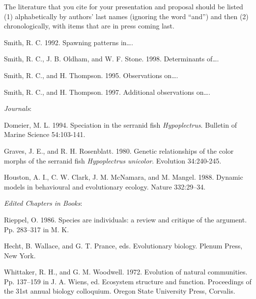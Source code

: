 \documentclass[10pt]{article}
\newcommand{\VSpace}{\vspace{\baselineskip}}
\begin{document}
The literature that you cite for your presentation and proposal should be listed (1) alphabetically by authors’ last names (ignoring the word “and”) and then (2) chronologically, with items that are in press coming last.\VSpace

\noindent Smith, R. C. 1992. Spawning patterns in\dots.

\noindent Smith, R. C., J. B. Oldham, and W. F. Stone. 1998. Determinants of\dots.

\noindent Smith, R. C., and H. Thompson. 1995. Observations on\dots.

\noindent Smith, R. C., and H. Thompson. 1997. Additional observations on\dots.\VSpace

\emph{Journals}:\vspace{0.5\baselineskip}

\begin{hangparas}{1.5em}{1}
Domeier, M. L. 1994. Speciation in the serranid fish \textit{Hypoplectrus}. Bulletin of Marine Science 54:103-141.

Graves, J. E., and R. H. Rosenblatt. 1980. Genetic relationships of the color morphs of the serranid fish \textit{Hypoplectrus unicolor}. Evolution 34:240-245.

Houston, A. I., C. W. Clark, J. M. McNamara, and M. Mangel. 1988. Dynamic models in behavioural and evolutionary ecology. Nature 332:29–34.\VSpace
\end{hangparas}

\emph{Edited Chapters in Books}:\vspace{0.5\baselineskip}

\begin{hangparas}{1.5em}{1}
Rieppel, O. 1986. Species are individuals: a review and critique of the argument. Pp. 283–317 in M. K. 

Hecht, B. Wallace, and G. T. Prance, eds. Evolutionary biology. Plenum Press, New York.

Whittaker, R. H., and G. M. Woodwell. 1972. Evolution of natural communities. Pp. 137–159 in J. A. Wiens, ed. Ecosystem structure and function. Proceedings of the 31st annual biology colloquium. Oregon State University Press, Corvalis.
\end{hangparas}

\newpage
\end{document}
